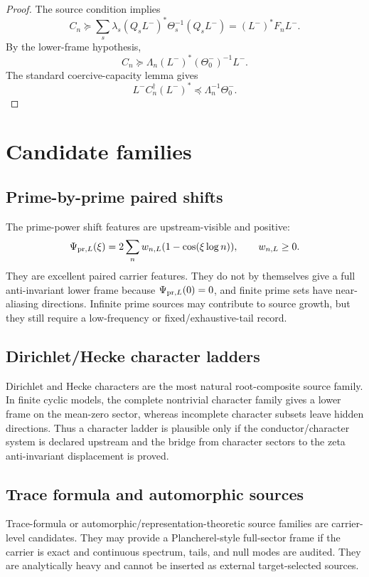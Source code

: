 \documentclass[11pt]{article}
\begin{document}
\begin{proof}
The source condition implies
\[
C_n\succeq \sum_s \lambda_s (Q_sL^-)^*\Theta_s^{-1}(Q_sL^-)
= (L^-)^*F_nL^-.
\]
By the lower-frame hypothesis,
\[
C_n\succeq \Lambda_n (L^-)^*(\Theta_0^-)^{-1}L^-.
\]
The standard coercive-capacity lemma gives
\[
L^-C_n^\dagger(L^-)^*\preceq \Lambda_n^{-1}\Theta_0^-.
\]
\end{proof}

\section{Candidate families}
\subsection{Prime-by-prime paired shifts}
The prime-power shift features are upstream-visible and positive:
\[
\Psi_{{\rm pr},L}(\xi)=2\sum_n w_{n,L}(1-\cos(\xi\log n)),\qquad w_{n,L}\ge0.
\]
They are excellent paired carrier features.  They do not by themselves give a full anti-invariant lower frame because \(\Psi_{{\rm pr},L}(0)=0\), and finite prime sets have near-aliasing directions.  Infinite prime sources may contribute to source growth, but they still require a low-frequency or fixed/exhaustive-tail record.

\subsection{Dirichlet/Hecke character ladders}
Dirichlet and Hecke characters are the most natural root-composite source family.  In finite cyclic models, the complete nontrivial character family gives a lower frame on the mean-zero sector, whereas incomplete character subsets leave hidden directions.  Thus a character ladder is plausible only if the conductor/character system is declared upstream and the bridge from character sectors to the zeta anti-invariant displacement is proved.

\subsection{Trace formula and automorphic sources}
Trace-formula or automorphic/representation-theoretic source families are carrier-level candidates.  They may provide a Plancherel-style full-sector frame if the carrier is exact and continuous spectrum, tails, and null modes are audited.  They are analytically heavy and cannot be inserted as external target-selected sources.
\end{document}
